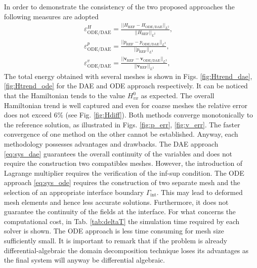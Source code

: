 \documentclass{ifacconf}
\begin{document}
In order to demonstrate the consistency of the two proposed approaches the following measures are adopted
\begin{align*}
\varepsilon^{H}_{\text{ODE}/\text{DAE}} = \frac{||H_{\text{REF}} - H_{\text{ODE}/\text{DAE}} ||_{L^2}}{||H_{\text{REF}}||_{L^2}}, \\
\varepsilon^p_{\text{ODE}/\text{DAE}} = \frac{||p_{\text{REF}} - p_{\text{ODE}/\text{DAE}} ||_{L^2}}{||p_{\text{REF}}||_{L^2}}, \\
\varepsilon^v_{\text{ODE}/\text{DAE}} = \frac{||\mathbf{v}_{\text{REF}} - \mathbf{v}_{\text{ODE}/\text{DAE}} ||_{L^2}}{||\mathbf{v}_{\text{REF}}||_{L^2}}, 
\end{align*}
The total energy obtained with several meshes is shown in Figs. \ref{fig:Htrend_dae}, \ref{fig:Htrend_ode} for the DAE and ODE approach respectively. It can be noticed that the Hamiltonian tends to the value $H_{vx}^0$ as expected. The overall Hamiltonian trend is well captured and even for coarse meshes the relative error does not exceed 6\% (see Fig. \ref{fig:Hdiff}).
Both methods converge monotonically to the reference solution, as illustrated in Figs. \ref{fig:p_err}, \ref{fig:v_err}. The faster convergence of one method on the other cannot be established. Anyway, each methodology possesses advantages and drawbacks. The DAE approach \eqref{eq:sys_dae} guarantees the overall continuity of the variables and does not require the construction two compatibles meshes. However, the introduction of Lagrange multiplier requires the verification of the inf-sup condition.  The ODE approach \eqref{eq:sys_ode} requires the construction of two separate mesh and the selection of an appropriate interface boundary $\Gamma_{\text{int}}$. This may lead to deformed mesh elements and hence less accurate solutions.  Furthermore, it does not guarantee the continuity of the fields at the interface. For what concerns the computational cost, in Tab. \ref{tab:deltaT} the simulation time required by each solver is shown. The ODE approach is less time consuming for mesh size sufficiently small. It is important to remark that if the problem is already differential-algebraic \cite{TFMST1,TFMST2} the domain decomposition technique loses its advantages as the final system will anyway be differential algebraic.
\end{document}
